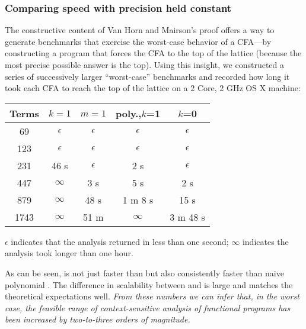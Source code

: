 \subsubsection{Comparing speed with precision held constant}
The constructive content of Van Horn and Mairson's proof offers a way
to generate benchmarks that exercise the worst-case behavior of a
CFA---by constructing a program that forces the CFA to the top of the
lattice (because the most precise possible answer is the top).
Using this insight, we constructed a series of successively larger
``worst-case'' benchmarks and recorded how long it took each CFA to
reach the top of the lattice on a 2 Core, 2 GHz OS X machine:
\begin{center}
{
\begin{tabular}{|c|c|c|c|c|}
\hline
\textsf{Terms} & \textsf{$k=1$} & \textsf{$m=1$} & \textsf{poly.,$k$=1} & \textsf{$k$=0}
\\
\hline
\hline
69 & $\epsilon$ &  $\epsilon$ & $\epsilon$ &  $\epsilon$
\\
\hline
123 & $\epsilon$ & $\epsilon$ & $\epsilon$ & $\epsilon$
\\
\hline
231 & 46 s & $\epsilon$ & 2 s & $\epsilon$
\\
\hline
447 & $\infty$ & 3 s & 5 s & 2 s
\\
\hline
879 & $\infty$ & 48 s & 1 m 8 s & 15 s
\\
\hline
1743 & $\infty$ & 51 m & $\infty$ &  3 m 48 s
\\
\hline
\end{tabular}
}
\end{center}
$\epsilon$ indicates that the analysis returned in less than one
second; $\infty$ indicates the analysis took longer than one hour.

As can be seen, \nCFA{} is not just faster than \kCFA{}
but also consistently faster than naive polynomial \kCFA{}. The difference
in scalability between \nCFA{} and \kCFA{} is large and matches
the theoretical expectations well.
\emph{From these numbers we can infer that, in the worst case, the
  feasible range of context-sensitive analysis of functional programs
  has been increased by two-to-three orders of magnitude.}


